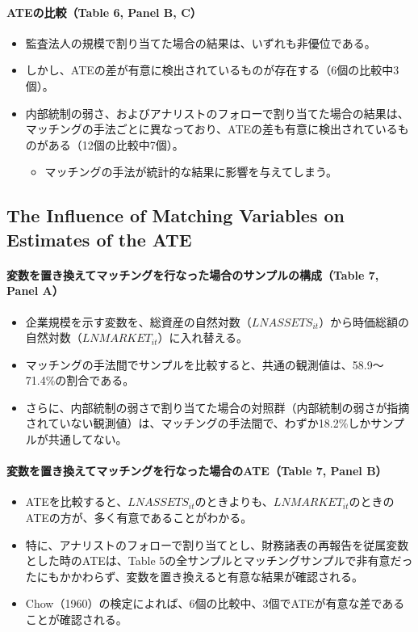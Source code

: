 \paragraph{ATEの比較（Table 6, Panel B, C）}

\begin{itemize}
 \item 監査法人の規模で割り当てた場合の結果は、いずれも非優位である。
 \item しかし、ATEの差が有意に検出されているものが存在する（6個の比較中3個）。
 \item 内部統制の弱さ、およびアナリストのフォローで割り当てた場合の結果は、マッチングの手法ごとに異なっており、ATEの差も有意に検出されているものがある（12個の比較中7個）。
  \begin{itemize}
   \item マッチングの手法が統計的な結果に影響を与えてしまう。
  \end{itemize}
\end{itemize}

\subsection{The Influence of Matching Variables on Estimates of the ATE}

\paragraph{変数を置き換えてマッチングを行なった場合のサンプルの構成（Table 7, Panel A）}

\begin{itemize}
 \item 企業規模を示す変数を、総資産の自然対数（$\mathit{LNASSETS}_{it}$）から時価総額の自然対数（$\mathit{LNMARKET}_{it}$）に入れ替える。
 \item マッチングの手法間でサンプルを比較すると、共通の観測値は、58.9〜71.4\%の割合である。
 \item さらに、内部統制の弱さで割り当てた場合の対照群（内部統制の弱さが指摘されていない観測値）は、マッチングの手法間で、わずか18.2\%しかサンプルが共通してない。
\end{itemize}

\paragraph{変数を置き換えてマッチングを行なった場合のATE（Table 7, Panel B）}

\begin{itemize}
 \item ATEを比較すると、$\mathit{LNASSETS}_{it}$のときよりも、$\mathit{LNMARKET}_{it}$のときのATEの方が、多く有意であることがわかる。
 \item 特に、アナリストのフォローで割り当てとし、財務諸表の再報告を従属変数とした時のATEは、Table 5の全サンプルとマッチングサンプルで非有意だったにもかかわらず、変数を置き換えると有意な結果が確認される。
 \item Chow（1960）の検定によれば、6個の比較中、3個でATEが有意な差であることが確認される。
\end{itemize}

